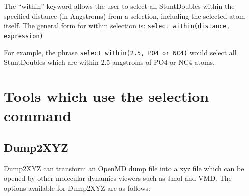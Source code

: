 \documentclass[letterpaper]{report}
\begin{document}
The ``within'' keyword allows the user to select all StuntDoubles
within the specified distance (in Angstroms) from a selection,
including the selected atom itself. The general form for within
selection is: {\tt select within(distance, expression)}
 
For example, the phrase {\tt select within(2.5, PO4 or NC4)} would
select all StuntDoubles which are within 2.5 angstroms of PO4 or NC4
atoms.

\section{\label{section:tools}Tools which use the selection command}

\subsection{\label{section:Dump2XYZ}Dump2XYZ}

Dump2XYZ can transform an OpenMD dump file into a xyz file which can
be opened by other molecular dynamics viewers such as Jmol and
VMD. The options available for Dump2XYZ are as follows:
\end{document}
